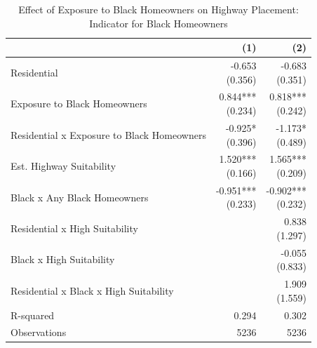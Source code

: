 \begin{table}[h]
\centering
\caption{Effect of Exposure to Black Homeowners on Highway Placement: Indicator for Black Homeowners}
\label{tab:outside_corridor_black_homeowners_indicator}
\begin{threeparttable}
\begin{tabular*}{0.8\textwidth}{@{\extracolsep{\fill}}l*{2}{r}}
\toprule
 & (1) & (2) \\
\midrule
Residential & \makecell[tr]{-0.653 \\ (0.356)} & \makecell[tr]{-0.683 \\ (0.351)} \\
Exposure to Black Homeowners & \makecell[tr]{0.844{***} \\ (0.234)} & \makecell[tr]{0.818{***} \\ (0.242)} \\
Residential x Exposure to Black Homeowners & \makecell[tr]{-0.925{*} \\ (0.396)} & \makecell[tr]{-1.173{*} \\ (0.489)} \\
Est. Highway Suitability & \makecell[tr]{1.520{***} \\ (0.166)} & \makecell[tr]{1.565{***} \\ (0.209)} \\
Black x Any Black Homeowners & \makecell[tr]{-0.951{***} \\ (0.233)} & \makecell[tr]{-0.902{***} \\ (0.232)} \\
Residential x High Suitability &  & \makecell[tr]{0.838 \\ (1.297)} \\
Black x High Suitability &  & \makecell[tr]{-0.055 \\ (0.833)} \\
Residential x Black x High Suitability &  & \makecell[tr]{1.909 \\ (1.559)} \\
R-squared & 0.294 & 0.302 \\
Observations & 5236 & 5236 \\
\bottomrule
\end{tabular*}
\begin{tablenotes}[flushleft]
\footnotesize

\end{tablenotes}
\end{threeparttable}
\end{table}
